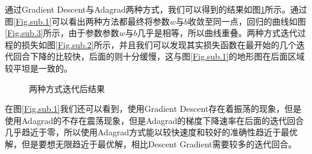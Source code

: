 \documentclass[10]{article}
\begin{document}
		通过Gradient Descent与Adagrad两种方式，我们可以得到的结果如图\ref{fig:visual_smap}所示。通过图\ref{Fig.sub.1}可以看出两种方法都最终将参数$ w$与$b $收敛至同一点，回归的曲线如图\ref{Fig.sub.3}所示，由于参数参数$ w$与$b $几乎是相等，所以曲线重叠。两种方式迭代过程的损失如图\ref{Fig.sub.2}所示，并且我们可以发现其实损失函数在最开始的几个迭代回合下降的比较快，后面的则十分缓慢，这与图\ref{Fig.sub.1}的地形图在后面区域较平坦是一致的。
		\begin{figure}[H]
			\centering
			\caption{两种方式迭代后结果}
			\label{Fig.lable}
			\label{fig:visual_smap}
		\end{figure}		
		在图\ref{Fig.sub.1}我们还可以看到，使用Gradient Descent存在着振荡的现象，但是使用Adagrad的不存在震荡现象，但是Adagrad的梯度下降速率在后面的迭代回合几乎趋近于零，所以使用Adagrad方式能以较快速度和较好的准确性趋近于最优解，但是要想无限趋近于最优解，相比Descent Gradient需要较多的迭代回合。	
		
		
\end{document}
